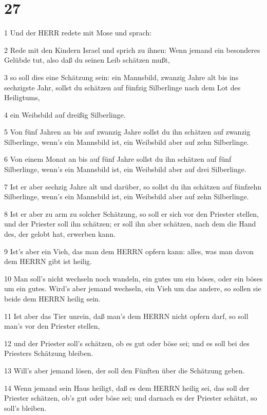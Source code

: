 \chapter{27}

\par 1 Und der HERR redete mit Mose und sprach:
\par 2 Rede mit den Kindern Israel und sprich zu ihnen: Wenn jemand ein besonderes Gelübde tut, also daß du seinen Leib schätzen mußt,
\par 3 so soll dies eine Schätzung sein: ein Mannsbild, zwanzig Jahre alt bis ins sechzigste Jahr, sollst du schätzen auf fünfzig Silberlinge nach dem Lot des Heiligtums,
\par 4 ein Weibsbild auf dreißig Silberlinge.
\par 5 Von fünf Jahren an bis auf zwanzig Jahre sollst du ihn schätzen auf zwanzig Silberlinge, wenn's ein Mannsbild ist, ein Weibsbild aber auf zehn Silberlinge.
\par 6 Von einem Monat an bis auf fünf Jahre sollst du ihn schätzen auf fünf Silberlinge, wenn's ein Mannsbild ist, ein Weibsbild aber auf drei Silberlinge.
\par 7 Ist er aber sechzig Jahre alt und darüber, so sollst du ihn schätzen auf fünfzehn Silberlinge, wenn's ein Mannsbild ist, ein Weibsbild aber auf zehn Silberlinge.
\par 8 Ist er aber zu arm zu solcher Schätzung, so soll er sich vor den Priester stellen, und der Priester soll ihn schätzen; er soll ihn aber schätzen, nach dem die Hand des, der gelobt hat, erwerben kann.
\par 9 Ist's aber ein Vieh, das man dem HERRN opfern kann: alles, was man davon dem HERRN gibt ist heilig.
\par 10 Man soll's nicht wechseln noch wandeln, ein gutes um ein böses, oder ein böses um ein gutes. Wird's aber jemand wechseln, ein Vieh um das andere, so sollen sie beide dem HERRN heilig sein.
\par 11 Ist aber das Tier unrein, daß man's dem HERRN nicht opfern darf, so soll man's vor den Priester stellen,
\par 12 und der Priester soll's schätzen, ob es gut oder böse sei; und es soll bei des Priesters Schätzung bleiben.
\par 13 Will's aber jemand lösen, der soll den Fünften über die Schätzung geben.
\par 14 Wenn jemand sein Haus heiligt, daß es dem HERRN heilig sei, das soll der Priester schätzen, ob's gut oder böse sei; und darnach es der Priester schätzt, so soll's bleiben.
